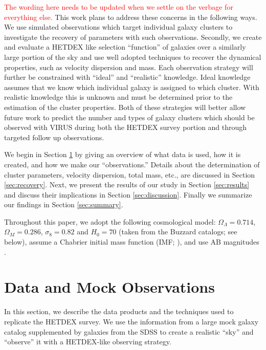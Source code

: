 \documentclass[fleqn,usenatbib]{mnras}
\newcommand{\editorial}[1]{\textcolor{red}{#1}}
\begin{document}
\editorial{The wording here needs to be updated when we settle on the verbage for everything else.} This work plans to address these concerns in the following ways. We use simulated observations which target individual galaxy clusters to investigate the recovery of parameters with such observations. Secondly, we create and evaluate a HETDEX like selection ``function'' of galaxies over a similarly large portion of the sky and use well adopted techniques to recover the dynamical properties, such as velocity dispersion and mass. Each observation strategy will further be constrained with ``ideal'' and ``realistic'' knowledge. Ideal knowledge assumes that we know which individual galaxy is assigned to which cluster. With realistic knowledge this is unknown and must be determined prior to the estimation of the cluster properties. Both of these strategies will better allow future work to predict the number and types of galaxy clusters which should be observed with VIRUS during both the HETDEX survey portion and through targeted follow up observations.

We begin in Section \ref{sec:Data} by giving an overview of what data is used, how it is created, and how we make our ``observations.'' Details about the determination of cluster parameters, velocity dispersion, total mass, etc., are discussed in Section \ref{sec:recovery}. Next, we present the results of our study in Section \ref{sec:results} and discuss their implications in Section \ref{sec:discussion}. Finally we summarize our findings in Section \ref{sec:summary}.

Throughout this paper, we adopt the following cosmological model: $\Omega_\Lambda = 0.714$,
$\Omega_M = 0.286$, $\sigma_8 = 0.82$ and $H_0= 70$ \kms \mpc (taken from the Buzzard catalogs; see below), assume a Chabrier initial mass function (IMF; \citealt{Chabrier2003}), and use AB magnitudes \citep{Oke1974}.

\section{Data and Mock Observations}\label{sec:Data}
In this section, we describe the data products and the techniques used to replicate the HETDEX survey. We use the information from a large mock galaxy catalog supplemented by galaxies from the SDSS to create a realistic ``sky'' and ``observe'' it with a HETDEX-like observing strategy.
\end{document}
